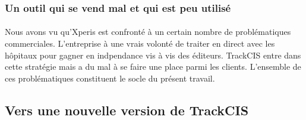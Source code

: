			\paragraph{}%
			
		\subsubsection{Un outil qui se vend mal et qui est peu utilisé}
			\paragraph{}%
			
			\paragraph{}
			Nous avons vu qu'Xperis est confronté à un certain nombre de problématiques
			commerciales. L'entreprise à une vrais volonté de traiter en direct avec les
			hôpitaux pour gagner en indpendance vis à vis des éditeurs. TrackCIS entre
			dans cette stratégie mais a du mal à se faire une place parmi les
			clients.\newline
			L'ensemble de ces problématiques constituent le socle du présent travail.
	
	\subsection{Vers une nouvelle version de TrackCIS}
